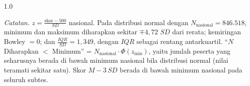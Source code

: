 \begin{table}[H]
    \centering
    \caption{Diagnostik Nonnormalitas Parameter Nasional Tidak Resmi per Subtes}
    \label{tab:nonnormal_diag}
    \begin{spacing}{1.0}
    \end{spacing}
    \vspace{2mm}
    \begin{flushleft}
    \footnotesize\textit{Catatan.} $z = \frac{\text{skor} - 500}{SD}$ nasional. Pada distribusi normal dengan $N_{\text{nasional}} = 846.518$, minimum dan maksimum diharapkan sekitar $\mp 4,72$ $SD$ dari rerata; kemiringan Bowley $= 0$; dan $\frac{IQR}{SD} = 1{,}349$, dengan $IQR$ sebagai rentang antarkuartil. ``$N$ Diharapkan $<$ Minimum'' = $N_{\text{nasional}} \cdot \Phi(z_{\min})$, yaitu jumlah peserta yang seharusnya berada di bawah minimum nasional bila distribusi normal (nilai teramati sekitar satu). Skor $M - 3\,SD$ berada di bawah minimum nasional pada seluruh subtes.
    \end{flushleft}
\end{table}
